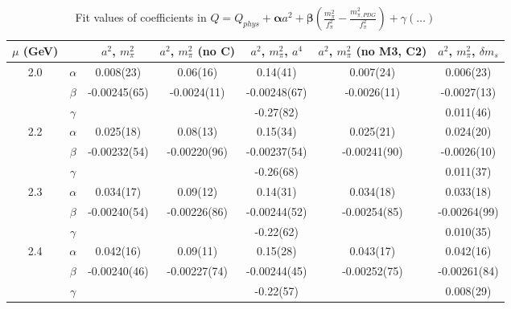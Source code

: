 \documentclass[12pt]{extarticle}
\begin{document}
\begin{table}[h!]
\begin{center}
\begin{tabular}{|c c|c|c|c|c|c|}
\hline
$\mu$ (GeV) &  & $a^2$, $m_\pi^2$& $a^2$, $m_\pi^2$ (no C)& $a^2$, $m_\pi^2$, $a^4$& $a^2$, $m_\pi^2$ (no M3, C2)& $a^2$, $m_\pi^2$, $\delta m_s$\\
\hline
\multirow{3}{0.5in}{2.0} & $\alpha$ & 0.008(23)& 0.06(16)& 0.14(41)& 0.007(24)& 0.006(23)\\
 & $\beta$ & -0.00245(65)& -0.0024(11)& -0.00248(67)& -0.0026(11)& -0.0027(13)\\
 & $\gamma$ &  &  & -0.27(82)&  & 0.011(46)\\
\hline
\multirow{3}{0.5in}{2.2} & $\alpha$ & 0.025(18)& 0.08(13)& 0.15(34)& 0.025(21)& 0.024(20)\\
 & $\beta$ & -0.00232(54)& -0.00220(96)& -0.00237(54)& -0.00241(90)& -0.0026(10)\\
 & $\gamma$ &  &  & -0.26(68)&  & 0.011(37)\\
\hline
\multirow{3}{0.5in}{2.3} & $\alpha$ & 0.034(17)& 0.09(12)& 0.14(31)& 0.034(18)& 0.033(18)\\
 & $\beta$ & -0.00240(54)& -0.00226(86)& -0.00244(52)& -0.00254(85)& -0.00264(99)\\
 & $\gamma$ &  &  & -0.22(62)&  & 0.010(35)\\
\hline
\multirow{3}{0.5in}{2.4} & $\alpha$ & 0.042(16)& 0.09(11)& 0.15(28)& 0.043(17)& 0.042(16)\\
 & $\beta$ & -0.00240(46)& -0.00227(74)& -0.00244(45)& -0.00252(75)& -0.00261(84)\\
 & $\gamma$ &  &  & -0.22(57)&  & 0.008(29)\\
\hline
\end{tabular}
\caption{Fit values of coefficients in $Q = Q_{phys} + \mathbf{\alpha} a^2 + \mathbf{\beta}\left(\frac{m_\pi^2}{f_\pi^2}-\frac{m_{\pi,PDG}^2}{f_\pi^2}\right) + \gamma(\ldots)$}
\end{center}
\end{table}




















\clearpage
\end{document}
